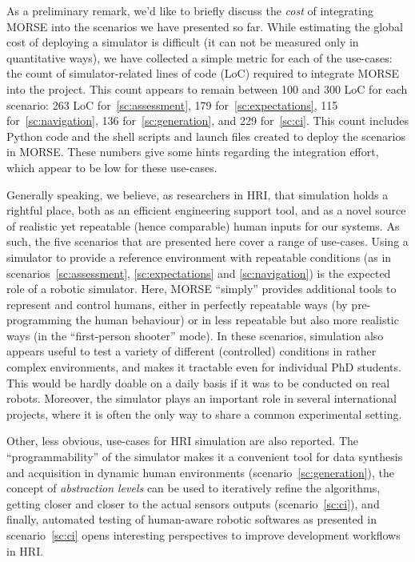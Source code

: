 \documentclass[conference]{IEEEtran}
\begin{document}
As a preliminary remark, we'd like to briefly discuss the \emph{cost} of
integrating MORSE into the scenarios we have presented so far. While estimating
the global cost of deploying a simulator is difficult (it can not be measured
only in quantitative ways), we have collected a simple metric for each of the
use-cases: the count of simulator-related lines of code ({\sc LoC}) required to
integrate MORSE into the project. This count appears to remain between 100 and
300 {\sc LoC} for each scenario: 263 {\sc LoC} for~\ref{sc:assessment}, 179
for~\ref{sc:expectations}, 115 for~\ref{sc:navigation}, 136
for~\ref{sc:generation}, and 229 for~\ref{sc:ci}. This count includes Python
code and the shell scripts and launch files created to deploy the scenarios in
MORSE. These numbers give some hints regarding the integration effort, which
appear to be low for these use-cases.

Generally speaking, we believe, as researchers in HRI, that simulation holds a
rightful place, both as an efficient engineering support tool, and as a novel
source of realistic yet repeatable (hence comparable) human inputs for our
systems. As such, the five scenarios that are presented here cover a range of
use-cases. Using a simulator to provide a reference environment with repeatable
conditions (as in scenarios~\ref{sc:assessment}, \ref{sc:expectations} and
\ref{sc:navigation}) is the expected role of a robotic simulator. Here, MORSE
``simply'' provides additional tools to represent and control humans, either in
perfectly repeatable ways (by pre-programming the human behaviour) or in less
repeatable but also more realistic ways (in the ``first-person shooter'' mode).
In these scenarios, simulation also appears useful to test a variety of
different (controlled) conditions in rather complex environments, and makes it
tractable even for individual PhD students. This would be hardly doable on a
daily basis if it was to be conducted on real robots. Moreover, the
simulator plays an important role in several international projects, where it is
often the only way to share a common experimental setting.

Other, less obvious, use-cases for HRI simulation are also reported. The
``programmability'' of the simulator makes it a convenient tool for data
synthesis and acquisition in dynamic human environments
(scenario~\ref{sc:generation}), the concept of \emph{abstraction levels} can be
used to iteratively refine the algorithms, getting closer and closer to the
actual sensors outputs (scenario~\ref{sc:ci}), and finally, automated testing of
human-aware robotic softwares as presented in scenario~\ref{sc:ci} opens
interesting perspectives to improve development workflows in HRI.
\end{document}
